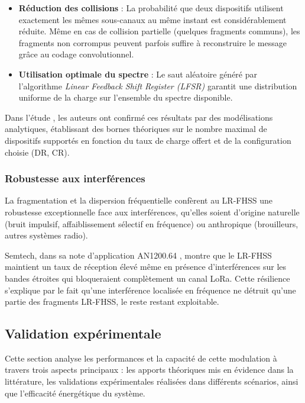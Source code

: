 \begin{itemize}
	\item \textbf{Réduction des collisions} : La probabilité que deux dispositifs utilisent exactement les mêmes sous-canaux au même instant est considérablement réduite. Même en cas de collision partielle (quelques fragments communs), les fragments non corrompus peuvent parfois suffire à reconstruire le message grâce au codage convolutionnel.
	
	\item \textbf{Utilisation optimale du spectre} : Le saut aléatoire généré par l'algorithme \textit{Linear Feedback Shift Register (LFSR)} \cite{lfsr} garantit une distribution uniforme de la charge sur l'ensemble du spectre disponible.
\end{itemize}

Dans l'étude \cite{arxiv_lrfhss_2020}, les auteurs ont confirmé ces résultats par des modélisations analytiques, établissant des bornes théoriques sur le nombre maximal de dispositifs supportés en fonction du taux de charge offert et de la configuration choisie (DR, CR).

\subsubsection{Robustesse aux interférences}

La fragmentation et la dispersion fréquentielle confèrent au LR-FHSS une robustesse exceptionnelle face aux interférences, qu'elles soient d'origine naturelle (bruit impulsif, affaiblissement sélectif en fréquence) ou anthropique (brouilleurs, autres systèmes radio).

Semtech, dans sa note d'application AN1200.64 \cite{semtech2022lrfhss}, montre que le LR-FHSS maintient un taux de réception élevé même en présence d'interférences sur les bandes étroites qui bloqueraient complètement un canal LoRa. Cette résilience s'explique par le fait qu'une interférence localisée en fréquence ne détruit qu'une partie des fragments LR-FHSS, le reste restant exploitable.

\subsection{Validation expérimentale}

Cette section analyse les performances et la capacité de cette modulation à travers trois aspects principaux : les apports théoriques mis en évidence dans la littérature, les validations expérimentales réalisées dans différents scénarios, ainsi que l’efficacité énergétique du système.

